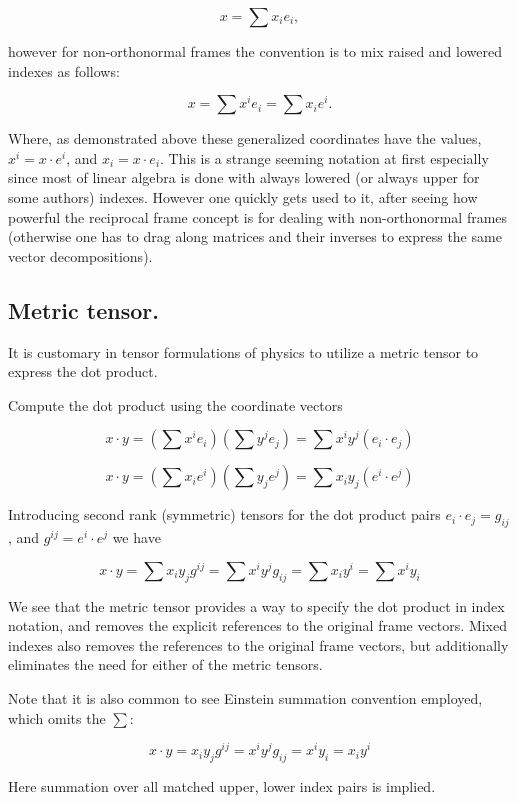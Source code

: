 \documentclass{article}      %
\begin{document}
\[
x = \sum x_i e_i,
\]

however for non-orthonormal frames the convention is to mix raised and lowered indexes as follows:

\[
x = \sum x^i e_i = \sum x_i e^i.
\]

Where, as demonstrated above these generalized coordinates have the values, $x^i = x \cdot e^i$, and $x_i = x \cdot e_i$.  This is a strange seeming notation at
first especially since most of linear algebra is done with always lowered (or always upper for some authors) indexes.  However one quickly gets used to it, after seeing how powerful the reciprocal frame concept is for dealing with non-orthonormal frames (otherwise one has to drag along matrices and their inverses to express the same vector decompositions).

\subsection{ Metric tensor. }

It is customary in tensor formulations of physics to utilize a metric tensor to express the dot product.

Compute the dot product using the coordinate vectors

\[
x \cdot y = \left(\sum x^i e_i \right)\left(\sum y^j e_j \right) = \sum x^i y^j \left( e_i \cdot e_j \right)
\]

\[
x \cdot y = \left(\sum x_i e^i \right)\left(\sum y_j e^j \right) = \sum x_i y_j \left( e^i \cdot e^j \right)
\]

Introducing second rank (symmetric) tensors for the dot product pairs $ e_i \cdot e_j = g_{ij}$, and $ g^{ij} = e^i \cdot e^j $ we have

\[
x \cdot y = \sum x_i y_j g^{ij} = \sum x^i y^j g_{ij} = \sum x_i y^i = \sum x^i y_i
\]

We see that the metric tensor provides a way to specify the dot product in index notation, and removes the explicit references to the original frame vectors.  Mixed indexes also removes the references to the original frame vectors, but additionally eliminates the need for either of the metric tensors.

Note that it is also common to see Einstein summation convention employed, which omits the $\sum$:

\[
x \cdot y = x_i y_j g^{ij} = x^i y^j g_{ij} = x^i y_i = x_i y^i
\]

Here summation over all matched upper, lower index pairs is implied.
\end{document}
